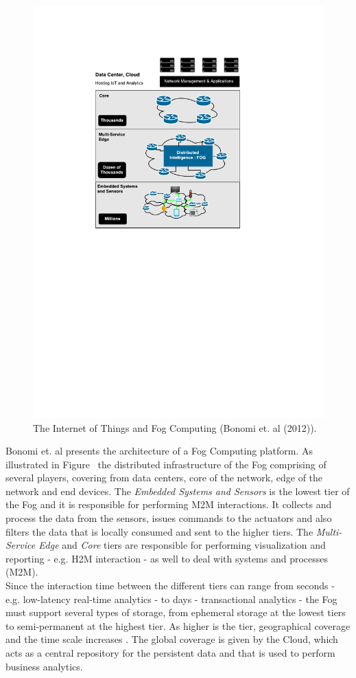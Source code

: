 \begin{figure}[ht!]
  \centering
  \includegraphics[width=.5\textwidth]{./figures/fog_architecture}
  \caption[IoT and Fog Computing.]{The Internet of Things and Fog Computing (Bonomi et. al (2012)).}
  \label{fig:fog_architecture}
\end{figure}

Bonomi et. al \cite{bonomi2012fog} presents the architecture of a Fog Computing platform. As illustrated
in Figure~\cite{bonomi2012fog} the distributed infrastructure of the Fog comprising of several players,
covering from data centers, core of the network, edge of the network and end devices. The \textit{Embedded Systems and Sensors}
is the lowest tier of the Fog and it is responsible for performing \gls{M2M} interactions. It collects and
process the data from the sensors, issues commands to the actuators and also filters the data that
is locally consumed and sent to the higher tiers. The \textit{Multi-Service Edge} and \textit{Core}
tiers are responsible for performing visualization and reporting - e.g. \gls{H2M} interaction -
as well to deal with systems and processes (\gls{M2M}).\\

Since the interaction time between the different tiers can range from seconds - e.g. low-latency real-time
analytics - to days - transactional analytics - the Fog must support several types of storage, from
ephemeral storage at the lowest tiers to semi-permanent at the highest tier. As higher is the tier,
geographical coverage and the time scale increases \cite{bonomi2014fog}. The global coverage
is given by the Cloud, which acts as a central repository for the persistent data and that is used
to perform business analytics.

